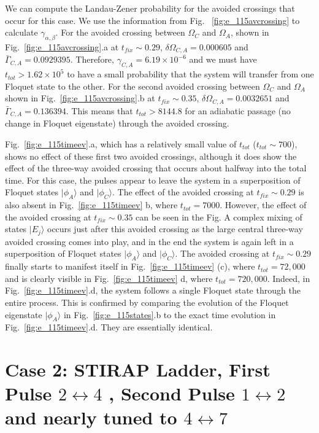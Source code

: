 \documentclass{article}
\begin{document}
We can  compute the Landau-Zener probability for the  avoided crossings that occur for this case.  We use the information from Fig. ~\ref{fig:e_115avcrossing} to calculate ${\gamma}_{\alpha,\beta}$. For the  avoided crossing between $\Omega_C$ and $\Omega_A$, shown in Fig.~\ref{fig:e_115avcrossing}.a at $t_{fix} \sim 0.29$,  $\delta\Omega_{C,A}=0.000605$ and ${\bar \Gamma}_{C,A}=0.0929395$. Therefore,  ${\gamma}_{C,A}=6.19{\times}10^{-6}$ and we must have $t_{tot}>1.62{\times}10^5$ to have a small  probability that the system will transfer from one Floquet state to the other.  For the second avoided crossing between $\Omega_C$ and $\Omega_A$ shown in Fig.~\ref{fig:e_115avcrossing}.b  at $t_{fix} \sim 0.35$, $\delta\Omega_{C,A}=0.0032651$ and ${\bar \Gamma}_{C,A}=0.136394$. This  means that $t_{tot}>8144.8$ for an adiabatic passage (no change in Floquet eigenstate) through the avoided crossing. 

Fig.~\ref{fig:e_115timeev}.a,  which has a relatively small value of $t_{tot}$ ($t_{tot}{\sim}700$), shows no effect of these first two avoided crossings, although  it does show the effect of the three-way avoided crossing that  occurs about halfway into the total time. For this case,  the pulses appear to leave the system in a superposition of Floquet states $|{\phi}_A{\rangle}$ and $|{\phi}_C{\rangle}$.   The effect of the avoided crossing at $t_{fix}{\sim}0.29$  is also absent in Fig.~\ref{fig:e_115timeev} b, where $t_{tot}=7000$.  However, the effect of the  avoided crossing at $t_{fix} \sim 0.35$ can be seen in the Fig.  A complex mixing of states $|E_j{\rangle}$ occurs just after this avoided crossing as the large central three-way avoided crossing comes into play, and in the end the system is again left in a superposition of Floquet states $|{\phi}_A{\rangle}$ and $|{\phi}_C{\rangle}$.   The avoided crossing at $t_{fix}{\sim}0.29$ finally  starts to manifest itself in Fig.~\ref{fig:e_115timeev} (c), where $t_{tot}=72,000$ and is clearly visible in Fig.~\ref{fig:e_115timeev} d, where $t_{tot}=720,000$.  Indeed, in  Fig.~\ref{fig:e_115timeev}.d,  the system follows a single Floquet state through the entire process.  This is  confirmed by comparing the evolution of the Floquet eigenstate $|\phi_A{\rangle}$ in Fig.~\ref{fig:e_115states}.b to the exact time evolution in Fig.~\ref{fig:e_115timeev}.d.  They are essentially identical.


%
%
\section{\label{sec:7} Case 2: STIRAP Ladder, First Pulse $2\leftrightarrow4$ , Second Pulse $1\leftrightarrow2$ and nearly tuned to $4\leftrightarrow7$}
%
%
\end{document}
